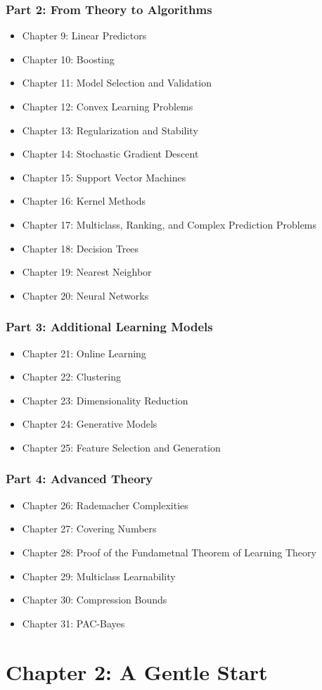 \documentclass{article}
\begin{document}
\section*{Part 2: From Theory to Algorithms}
\begin{itemize}
  \item Chapter 9: Linear Predictors
  \item Chapter 10: Boosting
  \item Chapter 11: Model Selection and Validation
  \item Chapter 12: Convex Learning Problems
  \item Chapter 13: Regularization and Stability
  \item Chapter 14: Stochastic Gradient Descent
  \item Chapter 15: Support Vector Machines
  \item Chapter 16: Kernel Methods
  \item Chapter 17: Multiclass, Ranking, and Complex Prediction Problems
  \item Chapter 18: Decision Trees
  \item Chapter 19: Nearest Neighbor
  \item Chapter 20: Neural Networks
\end{itemize}
\section*{Part 3: Additional Learning Models}
\begin{itemize}
  \item Chapter 21: Online Learning
  \item Chapter 22: Clustering
  \item Chapter 23: Dimensionality Reduction
  \item Chapter 24: Generative Models
  \item Chapter 25: Feature Selection and Generation
\end{itemize}

\section*{Part 4: Advanced Theory}
\begin{itemize}
  \item Chapter 26: Rademacher Complexities
  \item Chapter 27: Covering Numbers
  \item Chapter 28: Proof of the Fundametnal Theorem of Learning Theory
  \item Chapter 29: Multiclass Learnability
  \item Chapter 30: Compression Bounds
  \item Chapter 31: PAC-Bayes
\end{itemize}


\part*{Chapter 2: A Gentle Start}
\end{document}
